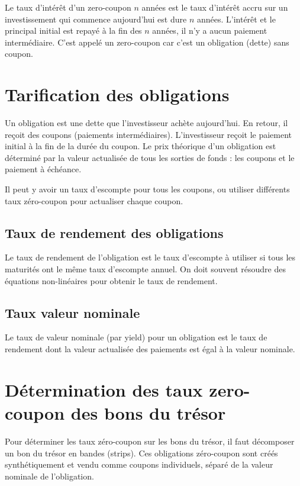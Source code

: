 Le taux d'intérêt d'un zero-coupon $n$ années est le taux d'intérêt accru sur un investissement qui commence aujourd'hui est dure $n$ années. L'intérêt et le principal initial est repayé à la fin des $n$ années, il n'y a aucun paiement intermédiaire. C'est appelé un zero-coupon car c'est un obligation (dette) sans coupon. 


\section{Tarification des obligations}

Un obligation est une dette que l'investisseur achète aujourd'hui. En retour, il reçoit des coupons (paiements intermédiaires). L'investisseur reçoit le paiement initial à la fin de la durée du coupon. Le prix théorique d'un obligation est déterminé par la valeur actualisée de tous les sorties de fonds : les coupons et le paiement à échéance. 

Il peut y avoir un taux d'escompte pour tous les coupons, ou utiliser différents taux zéro-coupon pour actualiser chaque coupon. 

\subsection{Taux de rendement des obligations}

Le taux de rendement de l'obligation est le taux d'escompte à utiliser si tous les maturités ont le même taux d'escompte annuel. On doit souvent résoudre des équations non-linéaires pour obtenir le taux de rendement.

\subsection{Taux valeur nominale}

Le taux de valeur nominale (par yield) pour un obligation est le taux de rendement dont la valeur actualisée des paiements est égal à la valeur nominale.

\section{Détermination des taux zero-coupon des bons du trésor}

Pour déterminer les taux zéro-coupon sur les bons du trésor, il faut décomposer un bon du trésor en bandes (strips). Ces obligations zéro-coupon sont créés synthétiquement et vendu comme coupons individuels, séparé de la valeur nominale de l'obligation. 


